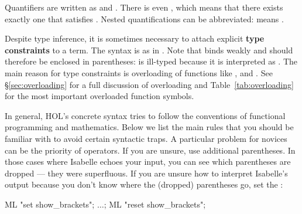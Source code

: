Quantifiers are written as
 and
. 
There is even
, which
means that there exists exactly one  that satisfies . 
Nested quantifications can be abbreviated:
 means
.

Despite type inference, it is sometimes necessary to attach explicit
\textbf{type constraints} to a term.  The syntax is
 as in . Note that
 binds weakly and should therefore be enclosed
in parentheses:  is ill-typed because it is interpreted as
. The main reason for type constraints is overloading of
functions like \isa{+}, \isa{*} and \isa{<}. See {\S}\ref{sec:overloading} for
a full discussion of overloading and Table~\ref{tab:overloading} for the most
important overloaded function symbols.

\begin{warn}
In general, HOL's concrete syntax tries to follow the conventions of
functional programming and mathematics. Below we list the main rules that you
should be familiar with to avoid certain syntactic traps. A particular
problem for novices can be the priority of operators. If you are unsure, use
additional parentheses. In those cases where Isabelle echoes your
input, you can see which parentheses are dropped --- they were superfluous. If
you are unsure how to interpret Isabelle's output because you don't know
where the (dropped) parentheses go, set the 
:
\begin{ttbox}
ML "set show_brackets"; \(\dots\); ML "reset show_brackets";
\end{ttbox}
\end{warn}

